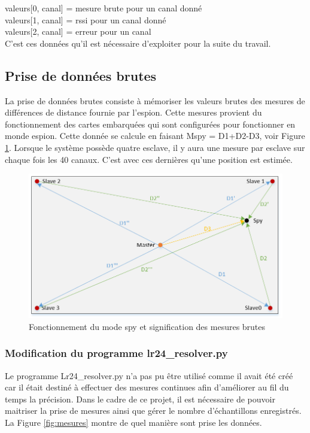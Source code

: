 valeurs[0, canal] = mesure brute pour un canal donné\\
valeurs[1, canal] = rssi pour un canal donné\\
valeurs[2, canal] = erreur pour un canal\\

C'est ces données qu'il est nécessaire d'exploiter pour la suite du travail. 


\subsection{Prise de données brutes}
La prise de données brutes consiste à mémoriser les valeurs brutes des mesures de différences de distance fournie par l'espion. Cette mesures provient du fonctionnement des cartes embarquées qui sont configurées pour fonctionner en monde espion. Cette donnée se calcule en faisant Mspy = D1+D2-D3, voir Figure \ref{fig:mesures3}. Lorsque le système possède quatre esclave, il y aura une mesure par esclave sur chaque fois les 40 canaux. C'est avec ces dernières qu'une position est estimée. 

\begin{figure}[htp]
	\begin{center}
		\includegraphics[scale=0.7]{figures/mesures3.png}
		\caption{Fonctionnement du mode spy et signification des mesures brutes}
		\label{fig:mesures3} %
	\end{center}
\end{figure}
 

\subsubsection{Modification du programme lr24\_resolver.py}
Le programme Lr24\_resolver.py n'a pas pu être utilisé comme il avait été créé car il était destiné à effectuer des mesures continues afin d'améliorer au fil du temps la précision. Dans le cadre de ce projet, il est nécessaire de pouvoir maitriser la prise de mesures ainsi que gérer le nombre d'échantillons enregistrés. La Figure \ref{fig:mesures} montre de quel manière sont prise les données.


